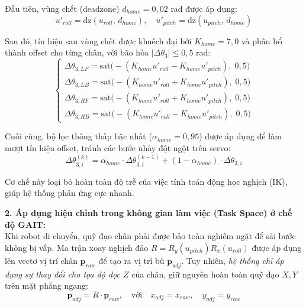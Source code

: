 Đầu tiên, vùng chết (deadzone) $d_{home} = 0{,}02$ rad được áp dụng:
\begin{equation}
u'_{roll} = \mathrm{dz}(u_{roll},\, d_{home}), \quad u'_{pitch} = \mathrm{dz}(u_{pitch},\, d_{home})
\end{equation}

Sau đó, tín hiệu sau vùng chết được khuếch đại bởi $K_{home} = 7{,}0$ và phân bổ thành offset cho từng chân, với bão hòa $|\Delta\theta_3| \leq 0{,}5$ rad:
\begin{equation}
\begin{cases} 
\Delta\theta_{3,LF} = \mathrm{sat}\big(- (K_{home} u'_{roll} - K_{home} u'_{pitch}),\; 0{,}5\big) \\
\Delta\theta_{3,LB} = \mathrm{sat}\big(- (K_{home} u'_{roll} + K_{home} u'_{pitch}),\; 0{,}5\big) \\
\Delta\theta_{3,RF} = \mathrm{sat}\big(- (K_{home} u'_{roll} + K_{home} u'_{pitch}),\; 0{,}5\big) \\
\Delta\theta_{3,RB} = \mathrm{sat}\big(- (K_{home} u'_{roll} - K_{home} u'_{pitch}),\; 0{,}5\big) 
\end{cases} \tag{5}
\end{equation}

Cuối cùng, bộ lọc thông thấp bậc nhất ($\alpha_{home} = 0{,}95$) được áp dụng để làm mượt tín hiệu offset, tránh các bước nhảy đột ngột trên servo:
\begin{equation}
\Delta\theta_{3,i}^{(k)} = \alpha_{home} \cdot \Delta\theta_{3,i}^{(k-1)} + (1 - \alpha_{home}) \cdot \Delta\theta_{3,i}
\end{equation}

Cơ chế này loại bỏ hoàn toàn độ trễ của việc tính toán động học nghịch (IK), giúp hệ thống phản ứng cực nhanh.

\textbf{2. Áp dụng hiệu chỉnh trong không gian làm việc (Task Space) ở chế độ GAIT:} \\
Khi robot di chuyển, quỹ đạo chân phải được bảo toàn nghiêm ngặt để sải bước không bị vấp. Ma trận xoay nghịch đảo $R = R_y(u_{pitch}) R_x(u_{roll})$ được áp dụng lên vectơ vị trí chân $\mathbf{p}_{raw}$ để tạo ra vị trí bù $\mathbf{p}_{adj}$. Tuy nhiên, \textit{hệ thống chỉ áp dụng sự thay đổi cho tọa độ dọc $Z$} của chân, giữ nguyên hoàn toàn quỹ đạo $X, Y$ trên mặt phẳng ngang:
\begin{equation}
\mathbf{p}_{adj} = R \cdot \mathbf{p}_{raw}, \quad \text{với} \quad x_{adj} = x_{raw}, \quad y_{adj} = y_{raw} \tag{6}
\end{equation}

